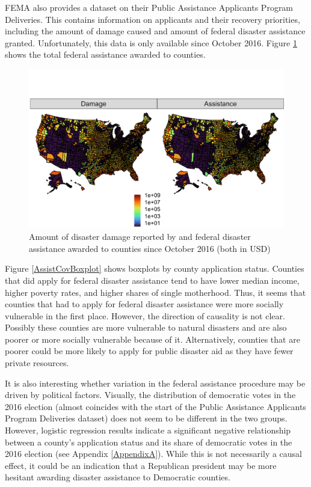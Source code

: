 


FEMA also provides a dataset on  their Public Assistance Applicants Program Deliveries. This contains information on applicants and their recovery priorities, including the amount of damage caused and amount of federal disaster assistance granted. Unfortunately, this data is only available since October 2016. Figure \ref{AssistanceMap} shows the total federal assistance awarded to counties.


\begin{figure}[!h]
	\centering
	\includegraphics[scale=1]{"../Code & Data/AssistanceMap.png"}
	\caption{Amount of disaster damage reported by and federal disaster assistance awarded to counties since October 2016 (both in USD)}
	\label{AssistanceMap}
\end{figure}


Figure \ref{AssistCovBoxplot} shows boxplots by county application status. Counties that did apply for federal disaster assistance tend to have lower median income, higher poverty rates, and higher shares of single motherhood. Thus, it seems that counties that had to apply for federal disaster assistance were more socially vulnerable in the first place. However, the direction of causality is not clear. Possibly these counties are more vulnerable to natural disasters and are also poorer or more socially vulnerable because of it. Alternatively, counties that are poorer could be more likely to apply for public disaster aid as they have fewer private resources.

It is also interesting whether variation in the federal assistance procedure may be driven by political factors. Visually, the distribution of democratic votes in the 2016 election (almost coincides with the start of the Public Assistance Applicants Program Deliveries dataset) does not seem to be different in the two groups. However, logistic regression results indicate a significant negative relationship between a county's application status and its share of democratic votes in the 2016 election (see Appendix \ref{AppendixA}). While this is not necessarily a causal effect, it could be an indication that a Republican president may be more hesitant awarding disaster assistance to Democratic counties.

